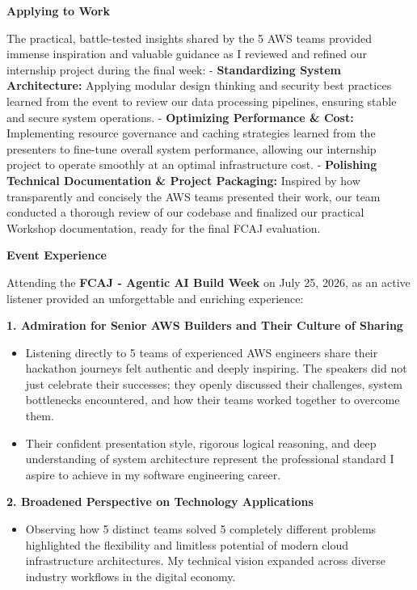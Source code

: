 \vspace{0.5em}\noindent\textbf{Applying to Work}

The practical, battle-tested insights shared by the 5 AWS teams provided
immense inspiration and valuable guidance as I reviewed and refined our
internship project during the final week: - \textbf{Standardizing System
Architecture:} Applying modular design thinking and security best
practices learned from the event to review our data processing
pipelines, ensuring stable and secure system operations. -
\textbf{Optimizing Performance \& Cost:} Implementing resource
governance and caching strategies learned from the presenters to
fine-tune overall system performance, allowing our internship project to
operate smoothly at an optimal infrastructure cost. - \textbf{Polishing
Technical Documentation \& Project Packaging:} Inspired by how
transparently and concisely the AWS teams presented their work, our team
conducted a thorough review of our codebase and finalized our practical
Workshop documentation, ready for the final FCAJ evaluation.

\vspace{0.5em}\noindent\textbf{Event Experience}

Attending the \textbf{FCAJ - Agentic AI Build Week} on July 25, 2026, as
an active listener provided an unforgettable and enriching experience:

\vspace{0.5em}\noindent\textbf{1. Admiration for Senior AWS Builders and Their Culture of
Sharing}

\begin{itemize}
\tightlist
\item
  Listening directly to 5 teams of experienced AWS engineers share their
  hackathon journeys felt authentic and deeply inspiring. The speakers
  did not just celebrate their successes; they openly discussed their
  challenges, system bottlenecks encountered, and how their teams worked
  together to overcome them.
\item
  Their confident presentation style, rigorous logical reasoning, and
  deep understanding of system architecture represent the professional
  standard I aspire to achieve in my software engineering career.
\end{itemize}

\vspace{0.5em}\noindent\textbf{2. Broadened Perspective on Technology Applications}

\begin{itemize}
\tightlist
\item
  Observing how 5 distinct teams solved 5 completely different problems
  highlighted the flexibility and limitless potential of modern cloud
  infrastructure architectures. My technical vision expanded across
  diverse industry workflows in the digital economy.
\end{itemize}

